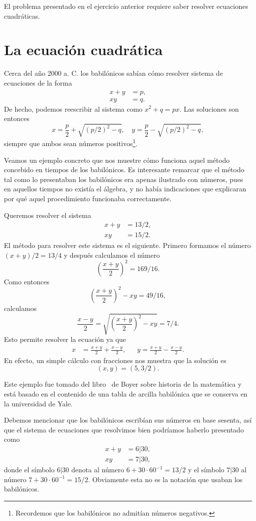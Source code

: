 El problema presentado en el ejercicio anterior requiere
saber resolver ecuaciones cuadráticas. 

\section*{La ecuación cuadrática}

Cerca del año 2000 a. C. 
los babilónicos sabían cómo resolver 
sistema de ecuaciones de la forma 
\begin{align*}
	x+y&=p,\\
	xy&=q.
\end{align*}
De hecho, podemos reescribir al sistema 
como $x^2+q=px$. Las soluciones son entonces 
\[
	x=\frac{p}{2}+\sqrt{(p/2)^2-q},\quad
	y=\frac{p}{2}-\sqrt{(p/2)^2-q},
\]
siempre que ambos sean números positivos\footnote{Recordemos que los
babilónicos no admitían números negativos.}.  

Veamos un ejemplo concreto que
nos muestre cómo funciona aquel método concebido en tiempos de los babilónicos. Es interesante remarcar
que el método tal como lo presentaban los babilónicos era apenas ilustrado con
números, pues en aquellos tiempos no existía el álgebra, y no había indicaciones que 
explicaran por qué aquel procedimiento funcionaba correctamente.


\begin{example}
	Queremos resolver el sistema 
	\begin{align*}
		x+y&=13/2,\\
		xy&=15/2.
	\end{align*}
	El método para resolver este sistema es el siguiente. Primero formamos el número $(x+y)/2=13/4$ y 
	después calculamos el número 
	\[
		\left(\frac{x+y}{2}\right)^2=169/16.
	\]
	Como entonces
	\[
		\left(\frac{x+y}{2}\right)^2-xy=49/16,
	\]
	calculamos
	\[
		\frac{x-y}{2}=\sqrt{\left(\frac{x+y}{2}\right)^2-xy}=7/4.
	\]
	Esto permite resolver la ecuación ya que 
	\begin{align*}
		x&=\frac{x+y}{2}+\frac{x-y}{2}, && %
		y=\frac{x+y}{2}-\frac{x-y}{2}.%
	\end{align*}
	En efecto, un simple cálculo con fracciones nos muestra que la solución 
	es 
	\[
		(x,y)=(5,3/2).
	\]
	
	Este ejemplo fue tomado del libro~\cite{MR1094813} de Boyer sobre historia
	de la matemática y está basado en el contenido de una tabla de arcilla 
	babilónica que se conserva en la universidad de Yale.  
	
	Debemos mencionar que los babilónicos
	escribían sus números en base sesenta, así que el sistema de ecuaciones que
	resolvimos bien podríamos haberlo presentado como 
	\begin{align*}
	x+y&=6|30,\\
	xy&=7|30,
\end{align*}
donde el símbolo $6|30$ denota al número $6+30\cdot 60^{-1}=13/2$ y el símbolo
$7|30$ al número $7+30\cdot 60^{-1}=15/2$. Obviamente esta no es la notación
que usaban los babilónicos.
\end{example}

